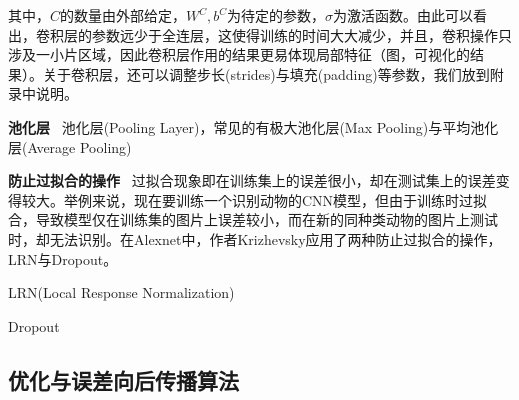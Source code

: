 其中，$C$的数量由外部给定，$W^C,b^C$为待定的参数，$\sigma$为激活函数。由此可以看出，卷积层的参数远少于全连层，这使得训练的时间大大减少，并且，卷积操作只涉及一小片区域，因此卷积层作用的结果更易体现局部特征（图，可视化的结果）。关于卷积层，还可以调整步长(strides)与填充(padding)等参数，我们放到附录中说明。

\textbf{池化层} \ 池化层(Pooling Layer)，常见的有极大池化层(Max Pooling)与平均池化层(Average Pooling)

\textbf{防止过拟合的操作} \ 过拟合现象即在训练集上的误差很小，却在测试集上的误差变得较大。举例来说，现在要训练一个识别动物的CNN模型，但由于训练时过拟合，导致模型仅在训练集的图片上误差较小，而在新的同种类动物的图片上测试时，却无法识别。在Alexnet中，作者Krizhevsky应用了两种防止过拟合的操作，LRN与Dropout。

LRN(Local Response Normalization)

Dropout

\subsection{优化与误差向后传播算法}